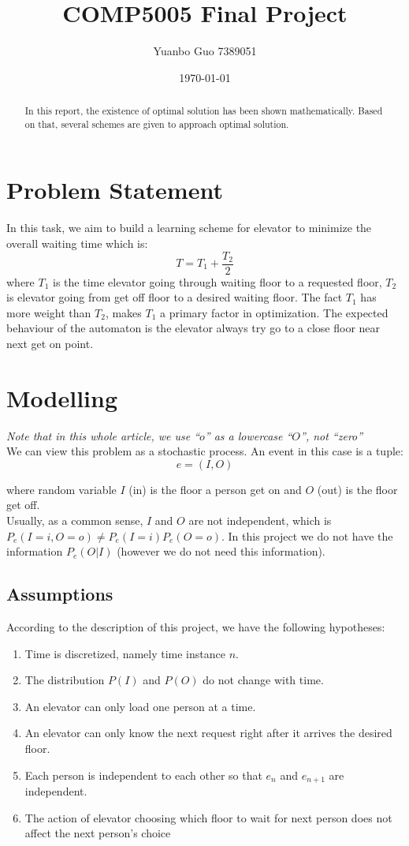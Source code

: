 \documentclass[11pt]{article}
\title{COMP5005 Final Project}
\author{Yuanbo Guo 7389051}
\date{\today}
\begin{document}
\maketitle
\newpage
\tableofcontents
\newpage

\begin{abstract}
In this report, the existence of optimal solution has been shown mathematically. Based on that, several schemes are given to approach optimal solution.
\end{abstract}
\section{Problem Statement}
In this task, we aim to build a learning scheme for elevator to minimize the overall waiting time which is:
$$T=T_1+\frac{T_2}{2}$$
where $T_1$ is the time elevator going through waiting floor to a requested floor, $T_2$ is elevator going from get off floor to a desired waiting floor.
The fact $T_1$ has more weight than $T_2$, makes $T_1$ a primary factor in optimization. The expected behaviour of the automaton is the elevator always try go to a close floor near next get on point.

\section{Modelling}
\emph{Note that in this whole article, we use ``$o$'' as a lowercase ``$O$'', not ``zero''}\\

We can view this problem as a stochastic process. An event in this case is a tuple: $$e=(I,O)$$

where random variable $I$ (in) is the floor a person get on and $O$ (out) is the floor get off.\\

Usually, as a common sense, $I$ and $O$ are not independent, which is $P_e(I=i,O=o) \neq P_e(I=i)P_e(O=o)$. In this project we do not have the information $P_e(O|I)$ (however we do not need this information).\\

\subsection{Assumptions}
According to the description of this project, we have the following hypotheses:

\begin{enumerate}
  \item Time is discretized, namely time instance $n$.
  \item The distribution $P(I)$ and $P(O)$ do not change with time.
  \item An elevator can only load one person at a time.
  \item An elevator can only know the next request right after it arrives the desired floor.
  \item Each person is independent to each other so that $e_n$ and $e_{n+1}$ are independent.
  \item The action of elevator choosing which floor to wait for next person does not affect the next person's choice
\end{enumerate}
\end{document}

